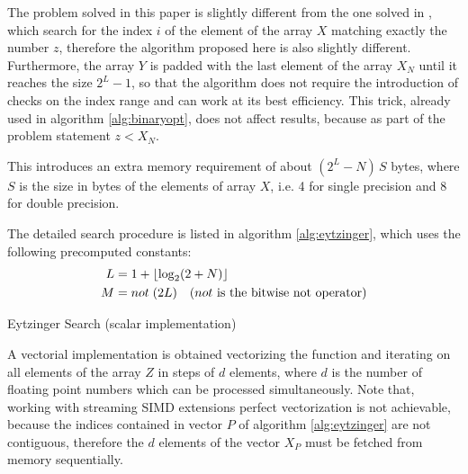 \documentclass[preprint,1p,times]{elsarticle}
\begin{document}
The problem solved in this paper is slightly different from the one solved in \cite{Morin2015}, which search for the index $i$ of the element of the array $X$ matching exactly the number $z$, therefore the algorithm proposed here is also slightly different. Furthermore, the array $Y$ is padded with the last element of the array $X_N$ until it reaches the size $2^L-1$, so that the algorithm does not require the introduction of checks on the index range and can work at its best efficiency. This trick, already used in algorithm \ref{alg:binaryopt}, does not affect results, because as part of the problem statement $z<X_N$.

This introduces an extra memory requirement of about $(2^L-N)\,S$ bytes, where $S$ is the size in bytes of the elements of array $X$, i.e. 4 for single precision and 8 for double precision.

The detailed search procedure is listed in algorithm \ref{alg:eytzinger}, which uses the following precomputed constants:
\begin{align*}
	L&=1+\left \lfloor \log_2(2+N) \right \rfloor \\
	M&= not \; (2L) \quad (not \text{ is the bitwise not operator})
\end{align*}
 
\begin{algorithm}
	\caption{Eytzinger Search (scalar implementation)}
	\label{alg:eytzinger}
	\begin{algorithmic}
			  
		\EndIf
				  
			\EndIf
		\EndWhile
		
		 
		
		\EndFunction
	\end{algorithmic}
\end{algorithm}

A vectorial implementation is obtained vectorizing the function and iterating on all elements of the 
array $Z$ in steps of $d$ elements, where $d$ is the number of floating point numbers which can be processed simultaneously. Note that, working with streaming SIMD extensions perfect vectorization is not achievable, because the indices contained in vector $P$ of algorithm \ref{alg:eytzinger} are not contiguous, therefore the $d$ elements of the vector $X_P$ must be fetched from memory sequentially.
\end{document}
